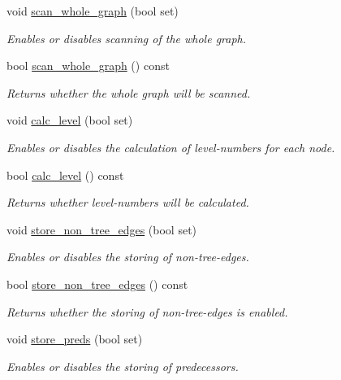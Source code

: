 \begin{DoxyCompactItemize}
void \mbox{\hyperlink{classbfs_a25fc51b1bfbbdd3afefe0a84c1bd2f6b}{scan\+\_\+whole\+\_\+graph}} (bool set)
\begin{DoxyCompactList}\small\item\em Enables or disables scanning of the whole graph. \end{DoxyCompactList}\item 
bool \mbox{\hyperlink{classbfs_a1378f5cfbc59b036e9215c02563bac23}{scan\+\_\+whole\+\_\+graph}} () const
\begin{DoxyCompactList}\small\item\em Returns whether the whole graph will be scanned. \end{DoxyCompactList}\item 
void \mbox{\hyperlink{classbfs_a491515da4eb8efca0be4fef0df350a8e}{calc\+\_\+level}} (bool set)
\begin{DoxyCompactList}\small\item\em Enables or disables the calculation of level-\/numbers for each node. \end{DoxyCompactList}\item 
bool \mbox{\hyperlink{classbfs_a78ea23abb1461e62dd7ecd416fecbd96}{calc\+\_\+level}} () const
\begin{DoxyCompactList}\small\item\em Returns whether level-\/numbers will be calculated. \end{DoxyCompactList}\item 
void \mbox{\hyperlink{classbfs_a7de47b820fb9532f497660f767c9457f}{store\+\_\+non\+\_\+tree\+\_\+edges}} (bool set)
\begin{DoxyCompactList}\small\item\em Enables or disables the storing of non-\/tree-\/edges. \end{DoxyCompactList}\item 
bool \mbox{\hyperlink{classbfs_a9fe165e0a6d979d6d55b6234bfbe5b8f}{store\+\_\+non\+\_\+tree\+\_\+edges}} () const
\begin{DoxyCompactList}\small\item\em Returns whether the storing of non-\/tree-\/edges is enabled. \end{DoxyCompactList}\item 
void \mbox{\hyperlink{classbfs_a8c7ce0ea2cd8e1932d1da5693d90cf61}{store\+\_\+preds}} (bool set)
\begin{DoxyCompactList}\small\item\em Enables or disables the storing of predecessors. \end{DoxyCompactList}\item 

\end{DoxyCompactItemize}
